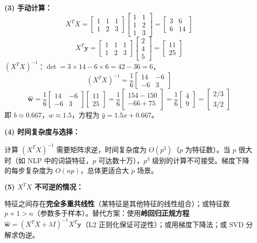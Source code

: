 \documentclass[a4paper,11pt]{ctexart}
\begin{document}
\begin{solutionbox}[参考答案与详细解析]
    \textbf{(3) 手动计算：}
    \[
    X^TX = \begin{bmatrix}1&1&1\\1&2&3\end{bmatrix}\begin{bmatrix}1&1\\1&2\\1&3\end{bmatrix} = \begin{bmatrix}3&6\\6&14\end{bmatrix}
    \]
    \[
    X^T\boldsymbol{y} = \begin{bmatrix}1&1&1\\1&2&3\end{bmatrix}\begin{bmatrix}2\\4\\5\end{bmatrix} = \begin{bmatrix}11\\25\end{bmatrix}
    \]
    $(X^TX)^{-1}$：$\det = 3\times14-6\times6=42-36=6$，
    \[
    (X^TX)^{-1} = \frac{1}{6}\begin{bmatrix}14&-6\\-6&3\end{bmatrix}
    \]
    \[
    \hat{\boldsymbol{w}} = \frac{1}{6}\begin{bmatrix}14&-6\\-6&3\end{bmatrix}\begin{bmatrix}11\\25\end{bmatrix} = \frac{1}{6}\begin{bmatrix}154-150\\-66+75\end{bmatrix} = \frac{1}{6}\begin{bmatrix}4\\9\end{bmatrix} = \begin{bmatrix}2/3\\3/2\end{bmatrix}
    \]
    即 $b \approx 0.667$，$w \approx 1.5$，方程为 $\hat{y} = 1.5x + 0.667$。

    \textbf{(4) 时间复杂度与选择：}

    计算 $(X^TX)^{-1}$ 需要矩阵求逆，时间复杂度为 $O(p^3)$（$p$ 为特征数）。当 $p$ 很大时（如 NLP 中的词袋特征，$p$ 可达数十万），$p^3$ 级别的计算不可接受。梯度下降的每步复杂度为 $O(np)$，总体更适合大 $p$ 场景。

    \textbf{(5) $X^TX$ 不可逆的情况：}

    特征之间存在\textbf{完全多重共线性}（某特征是其他特征的线性组合）；或特征数 $p+1 > n$（参数多于样本）。替代方案：使用\textbf{岭回归正规方程} $\hat{\boldsymbol{w}} = (X^TX + \lambda I)^{-1}X^T\boldsymbol{y}$（L2 正则化保证可逆性）；或用梯度下降法；或 SVD 分解求伪逆。
\end{solutionbox}
\end{document}
